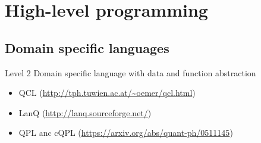 \documentclass{beamer}
\begin{document}
\begin{frame}{\insertsection}{\insertsubsection}
	
\end{frame}

\begin{frame}{\insertsection}{\insertsubsection}
	
\end{frame}

\begin{frame}{\insertsection}{\insertsubsection}
	
\end{frame}

\section{High-level programming}


\subsection{Domain specific languages}

\begin{frame}{\insertsection}{\insertsubsection}
    
\begin{block}{Level 2}
Domain specific language with data and function abstraction
\end{block}

\begin{itemize}
    \item QCL (\url{http://tph.tuwien.ac.at/~oemer/qcl.html})
    \item LanQ (\url{http://lanq.sourceforge.net/})
    \item QPL anc cQPL (\url{https://arxiv.org/abs/quant-ph/0511145})
\end{itemize}
\end{frame}


\end{document}
